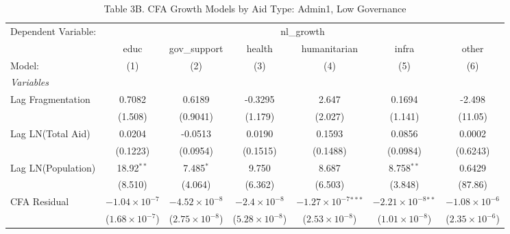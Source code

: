 \begin{table}[H]
   \caption{Table 3B. CFA Growth Models by Aid Type: Admin1, Low Governance}
   \centering
   \begin{tabular}{lcccccc}
      \tabularnewline \midrule \midrule
      Dependent Variable: & \multicolumn{6}{c}{nl\_growth}\\
                         & educ                    & gov\_support            & health                  & humanitarian                   & infra                         & other \\   
      Model:             & (1)                     & (2)                     & (3)                     & (4)                            & (5)                           & (6)\\  
      \midrule
      \emph{Variables}\\
      Lag Fragmentation  & 0.7082                  & 0.6189                  & -0.3295                 & 2.647                          & 0.1694                        & -2.498\\   
                         & (1.508)                 & (0.9041)                & (1.179)                 & (2.027)                        & (1.141)                       & (11.05)\\   
      Lag LN(Total Aid)  & 0.0204                  & -0.0513                 & 0.0190                  & 0.1593                         & 0.0856                        & 0.0002\\   
                         & (0.1223)                & (0.0954)                & (0.1515)                & (0.1488)                       & (0.0984)                      & (0.6243)\\   
      Lag LN(Population) & 18.92$^{**}$            & 7.485$^{*}$             & 9.750                   & 8.687                          & 8.758$^{**}$                  & 0.6429\\   
                         & (8.510)                 & (4.064)                 & (6.362)                 & (6.503)                        & (3.848)                       & (87.86)\\   
      CFA Residual       & $-1.04\times 10^{-7}$   & $-4.52\times 10^{-8}$   & $-2.4\times 10^{-8}$    & $-1.27\times 10^{-7}$$^{***}$  & $-2.21\times 10^{-8}$$^{**}$  & $-1.08\times 10^{-6}$\\    
                         & ($1.68\times 10^{-7}$)  & ($2.75\times 10^{-8}$)  & ($5.28\times 10^{-8}$)  & ($2.53\times 10^{-8}$)         & ($1.01\times 10^{-8}$)        & ($2.35\times 10^{-6}$)\\    

\end{tabular}
\end{table}
